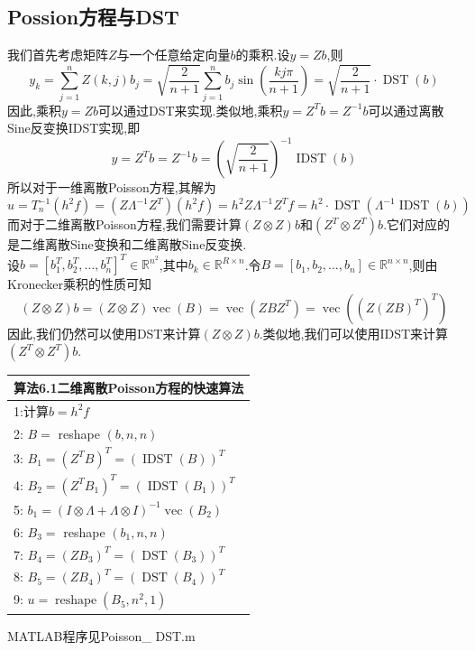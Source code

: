 \documentclass[12pt,a4paper]{article}
\begin{document}
\subsection*{Possion方程与DST}
我们首先考虑矩阵$Z$与一个任意给定向量$b$的乘积.设$y=Zb$,则
$$
y_{k}=\sum_{j=1}^{n} Z(k, j) b_{j}=\sqrt{\frac{2}{n+1}} \sum_{j=1}^{n} b_{j} \sin \left(\frac{k j \pi}{n+1}\right)=\sqrt{\frac{2}{n+1}} \cdot \operatorname{DST}(b)
$$
因此,乘积$y=Zb$可以通过DST来实现.类似地,乘积$y=Z^{T} b=Z^{-1} b$可以通过离散Sine反变换IDST实现,即
$$
y=Z^{T} b=Z^{-1} b=\left(\sqrt{\frac{2}{n+1}}\right)^{-1} \operatorname{IDST}(b)
$$
所以对于一维离散Poisson方程,其解为
$$
u=T_{n}^{-1}\left(h^{2} f\right)=\left(Z \Lambda^{-1} Z^{T}\right)\left(h^{2} f\right)=h^{2} Z \Lambda^{-1} Z^{T} f=h^{2} \cdot \operatorname{DST}\left(\Lambda^{-1} \operatorname{IDST}(b)\right)
$$
而对于二维离散Poisson方程,我们需要计算$(Z \otimes Z) b$和$\left(Z^{T} \otimes Z^{T}\right) b$.它们对应的是二维离散Sine变换和二维离散Sine反变换.\\
设$b=\left[b_{1}^{T}, b_{2}^{T}, \ldots, b_{n}^{T}\right]^{T} \in \mathbb{R}^{n^{2}}$,其中$b_{k} \in \mathbb{R}^{R \times n}$.令$B=\left[b_{1}, b_{2}, \ldots, b_{n}\right] \in\mathbb{R}^{n \times n}$,则由Kronecker乘积的性质可知
$$
(Z \otimes Z) b=(Z \otimes Z) \operatorname{vec}(B)=\operatorname{vec}\left(Z B Z^{T}\right)=\operatorname{vec}\left(\left(Z(Z B)^{T}\right)^{T}\right)
$$
因此,我们仍然可以使用DST来计算$(Z \otimes Z) b$.类似地,我们可以使用IDST来计算$\left(Z^{T} \otimes Z^{T}\right) b$.\\
\begin{tabular}{l}
\hline
{\color{blue}算法6.1}二维离散Poisson方程的快速算法\\
\hline
1:计算$b=h^{2} f$\\
2: $B=$ reshape $(b, n, n)$\\
3: $B_{1}=\left(Z^{T} B\right)^{T}=(\operatorname{IDST}(B))^{T}$\\
4: $B_{2}=\left(Z^{T} B_{1}\right)^{T}=\left(\operatorname{IDST}\left(B_{1}\right)\right)^{T}$\\
5: $b_{1}=(I \otimes \Lambda+\Lambda \otimes I)^{-1} \operatorname{vec}\left(B_{2}\right)$\\
6: $B_{3}=$ reshape $\left(b_{1}, n, n\right)$\\
7: $B_{4}=\left(Z B_{3}\right)^{T}=\left(\operatorname{DST}\left(B_{3}\right)\right)^{T}$\\
8: $B_{5}=\left(Z B_{4}\right)^{T}=\left(\operatorname{DST}\left(B_{4}\right)\right)^{T}$\\
9: $u=\operatorname{reshape}\left(B_{5}, n^{2}, 1\right)$\\
\hline
\end{tabular}
MATLAB程序见{\color{blue}Poisson\_ DST.m}
\end{document}
